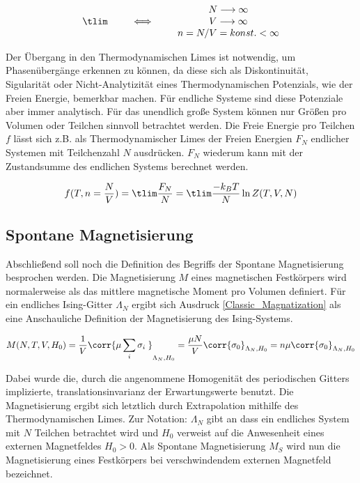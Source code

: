 \begin{equation} \label{Thermodynamischer Limes}
\centering
\begin{tabular}{lccccc}
        &  &                 &    &      $N \longrightarrow \infty$\\
$\tlim$ &  &  $\iff$           &   &      $V \longrightarrow \infty$ \\
        &  &                 &   & $n =  N/V = konst. < \infty$
\end{tabular}
\end{equation}

\noindent Der Übergang in den Thermodynamischen Limes ist notwendig, um  Phasenübergänge erkennen zu können, da diese sich als Diskontinuität, Sigularität oder Nicht-Analytizität eines Thermodynamischen Potenzials, wie der Freien Energie, bemerkbar machen. Für endliche Systeme sind diese Potenziale aber immer analytisch. Für das unendlich große System können nur Größen pro Volumen oder Teilchen sinnvoll betrachtet werden. Die Freie Energie pro Teilchen $f$ lässt sich z.B. als Thermodynamischer Limes der Freien Energien $F_N$ endlicher Systemen mit Teilchenzahl $N$ ausdrücken. $F_N$ wiederum kann mit der Zustandsumme des endlichen Systems berechnet werden. 

\begin{equation} \label{SP_FreieEnergie}
f(T,n = \frac{N}{V}) = \tlim \frac{F_N}{N} = \tlim \frac{-k_B T}{N} \ln Z(T,V,N) 
\end{equation}

\subsection{Spontane Magnetisierung}

Abschließend soll noch die Definition des Begriffs der Spontane Magnetisierung besprochen werden. Die Magnetisierung $M$ eines magnetischen Festkörpers wird normalerweise als das mittlere magnetische Moment pro Volumen definiert. Für ein endliches Ising-Gitter $\Lambda_N$ ergibt sich Ausdruck  \eqref{Classic_Magnatization} als eine Anschauliche Definition der Magnetisierung des Ising-Systems. 

\begin{equation} \label{Classic_Magnatization}
M(N,T,V,H_0)  = \frac{1}{V}\corr{ \mu \sum_i \sigma_i\;}_{\Lambda_N, H_0} = \frac{\mu N}{V}\corr{\sigma_0}_{\Lambda_N, H_0} = n \mu \corr{\sigma_0}_{\Lambda_N, H_0} 
\end{equation}

\noindent Dabei wurde die, durch die angenommene Homogenität des periodischen Gitters implizierte, translationsinvarianz der Erwartungswerte benutzt. Die Magnetisierung ergibt sich letztlich durch Extrapolation mithilfe des Thermodynamischen Limes. Zur Notation: $\Lambda_N$ gibt an dass ein endliches System mit $N$ Teilchen betrachtet wird und $H_0$ verweist auf die Anwesenheit eines externen Magnetfeldes $H_0 > 0$. Als Spontane Magnetisierung $M_S$ wird nun die Magnetisierung eines Festkörpers bei verschwindendem externen Magnetfeld bezeichnet. 

